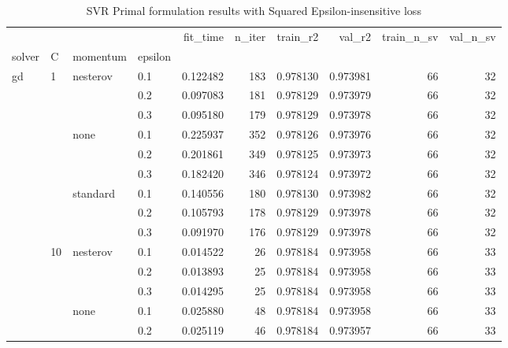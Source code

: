 \begin{table}[h!]
\centering
\caption{SVR Primal formulation results with Squared Epsilon-insensitive loss}
\label{primal_svr_squared_eps_cv_results}
\begin{tabular}{llllrrrrrr}
\toprule
          &     &   &     &  fit\_time &  n\_iter &     train\_r2 &       val\_r2 &  train\_n\_sv &  val\_n\_sv \\
solver & C & momentum & epsilon &           &         &              &              &             &           \\
\midrule
gd & 1   & nesterov & 0.1 &  0.122482 &     183 &     0.978130 &     0.973981 &          66 &        32 \\
          &     &   & 0.2 &  0.097083 &     181 &     0.978129 &     0.973979 &          66 &        32 \\
          &     &   & 0.3 &  0.095180 &     179 &     0.978129 &     0.973978 &          66 &        32 \\
          &     & none & 0.1 &  0.225937 &     352 &     0.978126 &     0.973976 &          66 &        32 \\
          &     &   & 0.2 &  0.201861 &     349 &     0.978125 &     0.973973 &          66 &        32 \\
          &     &   & 0.3 &  0.182420 &     346 &     0.978124 &     0.973972 &          66 &        32 \\
          &     & standard & 0.1 &  0.140556 &     180 &     0.978130 &     0.973982 &          66 &        32 \\
          &     &   & 0.2 &  0.105793 &     178 &     0.978129 &     0.973978 &          66 &        32 \\
          &     &   & 0.3 &  0.091970 &     176 &     0.978129 &     0.973978 &          66 &        32 \\
          & 10  & nesterov & 0.1 &  0.014522 &      26 &     0.978184 &     0.973958 &          66 &        33 \\
          &     &   & 0.2 &  0.013893 &      25 &     0.978184 &     0.973958 &          66 &        33 \\
          &     &   & 0.3 &  0.014295 &      25 &     0.978184 &     0.973958 &          66 &        33 \\
          &     & none & 0.1 &  0.025880 &      48 &     0.978184 &     0.973958 &          66 &        33 \\
          &     &   & 0.2 &  0.025119 &      46 &     0.978184 &     0.973957 &          66 &        33 \\

\end{tabular}
\end{table}
